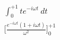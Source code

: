 \documentclass[preview]{standalone}
\begin{document}
\begin{align*}
\int_{0}^{+1}t e^{-i\omega t} \ dt \\\big[\frac{e^{-i\omega t}(1+i\omega t)}{\omega^{2}}]_{0}^{+1} \\
\end{align*}
\end{document}
